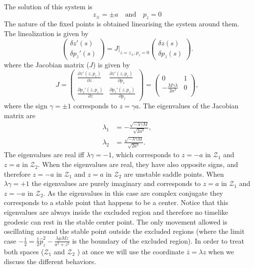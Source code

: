 The solution of this system is
\begin{equation}
 z_\pm= \pm a \quad \mbox{and} \quad p_z=0
\end{equation}
The nature of the fixed points is obtained linearising the system around them. The linealization is given by
\begin{equation}
\left(
\begin{array}{c}
 \delta z'(s) \\
 \delta p_z'(s)
\end{array}
\right)= J|_{z=z_\pm,p_z=0} \left(
\begin{array}{c}
 \delta z(s) \\
 \delta p_z(s)
\end{array}
\right).
\end{equation}
where the Jacobian matrix ($J$) is given by
\begin{equation}
J=\left(
\begin{array}{cc}
 \frac{\partial z'(z,p_z)}{\partial z} & \frac{\partial z'(z,p_z)}{\partial p_z} \\
 \frac{\partial p_z'(z,p_z)}{\partial z} & \frac{\partial p_z'(z,p_z)}{\partial p_z}
\end{array}
\right)=\left(
\begin{array}{cc}
 0 & 1 \\
 -\frac{M \gamma \lambda }{2 a^3} & 0 \\
\end{array}
\right),
\end{equation}
where the sign $\gamma=\pm 1$ corresponds to $ z= \gamma a$. The eigenvalues of the Jacobian matrix are
\begin{align}
 \lambda_1&=-\frac{\sqrt{-\lambda \gamma M }}{\sqrt{2a^3 }},\\
 \lambda_2&=\frac{\sqrt{-\lambda \gamma M }}{\sqrt{2 a^3} }.
\end{align}
The eigenvalues are real iff $\lambda \gamma = -1$, which corresponds to $z=-a$ in $\mathcal{Z}_1$ and $z=a$ in $\mathcal{Z}_2$. When the eigenvalues are real, they have also opposite signs, and therefore $z=-a$ in $\mathcal{Z}_1$ and $z=a$ in $\mathcal{Z}_2$ are unstable saddle points. When $\lambda \gamma = +1$ the eigenvalues are purely imaginary and corresponds to $z=a$ in $\mathcal{Z}_1$ and $z=-a$ in $\mathcal{Z}_2$. As the eigenvalues in this case are complex conjugate they corresponds to a stable point that happens to be a center. Notice that this eigenvalues are always inside the excluded region and therefore no timelike geodesic can rest in the stable center point. The only movement allowed is oscillating around the stable point outside the excluded regions (where the limit case $-\frac{1}{2}=\frac{1}{2} \hat{p}_z^2 -\frac{ \lambda  \mu  M z}{a^2+z^2}$ is the boundary of the excluded region). In order to treat both spaces ($\mathcal{Z}_1$  and $\mathcal{Z}_2$ ) at once we will use the coordinate $\bar z= \lambda z$ when we discuss the different behaviors.

